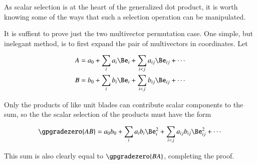 As scalar selection is at the heart of the
generalized dot product, it is worth knowing
some of the ways that such a selection operation can be manipulated.


It is suffient to prove just the two multivector permutation case.
One simple, but inelegant method, is to first expand the pair of multivectors in coordinates.  Let

\begin{equation}\label{eqn:scalarSelectionPermutation:40}
\begin{aligned}
A &= a_0 + \sum_i a_i \Be_i + \sum_{i < j} a_{ij} \Be_{ij} + \cdots \\
B &= b_0 + \sum_i b_i \Be_i + \sum_{i < j} b_{ij} \Be_{ij} + \cdots
\end{aligned}
\end{equation}

Only the products of like unit blades can contribute scalar components to the sum, so the
the scalar selection of the products must have the form

\begin{dmath}\label{eqn:scalarSelectionPermutation:60}
\gpgradezero{ A B }
=
a_0 b_0 + \sum_i a_i b_i \Be_i^2 + \sum_{i < j} a_{ij} b_{ij} \Be_{ij}^2 + \cdots
\end{dmath}

This sum is also clearly equal to \( \gpgradezero{ B A } \), completing the proof.
